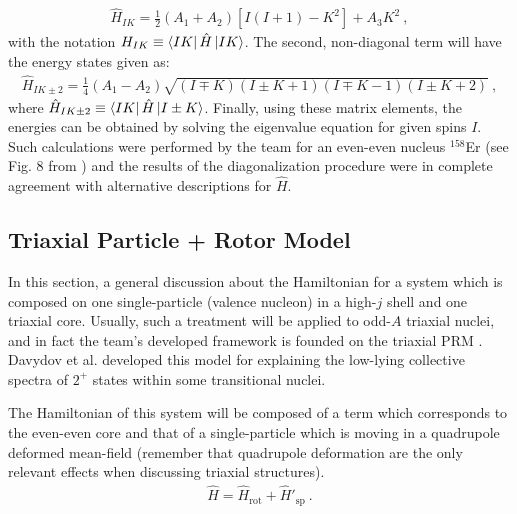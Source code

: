 \begin{align}
    \hat{H}_{IK}=\frac{1}{2}(A_1+A_2)\left[I(I+1)-K^2\right]+A_3K^2\ ,
\end{align}
with the notation $H_{IK}\equiv\bra{IK}\hat{H}\ket{IK}$. The second, non-diagonal term will have the energy states given as:
\begin{align}
    \hat{H}_{IK\pm2}=\frac{1}{4}(A_1-A_2)\sqrt{(I\mp K)(I\pm K +1)(I \mp K -1)(I\pm K +2)}\ ,
\end{align}
where $\hat{H}_{IK\pm 2}\equiv \bra{IK}\hat{H}\ket{I\pm K}$. Finally, using these matrix elements, the energies can be obtained by solving the eigenvalue equation for given spins $I$. Such calculations were performed by the team for an even-even nucleus $^{158}$Er (see Fig. 8 from  \cite{raduta2017semiclassical}) and the results of the diagonalization procedure were in complete agreement with alternative descriptions for $\hat{H}$.

\subsection{Triaxial Particle + Rotor Model}

In this section, a general discussion about the Hamiltonian for a system which is composed on one single-particle (valence nucleon) in a high-$j$ shell and one triaxial core. Usually, such a treatment will be applied to odd-$A$ triaxial nuclei, and in fact the team's developed framework is founded on the triaxial PRM \cite{davydov1958rotational}. Davydov et al. developed this model for explaining the low-lying collective spectra of $2^+$ states within some transitional nuclei.

The Hamiltonian of this system will be composed of a term which corresponds to the even-even core and that of a single-particle which is moving in a quadrupole deformed mean-field (remember that quadrupole deformation are the only relevant effects when discussing triaxial structures).
\begin{align}
    \hat{H}=\hat{H}_\text{rot}+\hat{H}'_\text{sp}\ .
    \label{triaxial-prm-general-hamiltonian}
\end{align}

